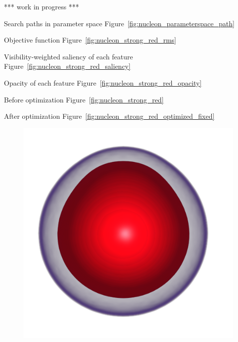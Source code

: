 *** work in progress ***

Search paths in parameter space
Figure~\ref{fig:nucleon_parameterspace_path}

Objective function
Figure~\ref{fig:nucleon_strong_red_rms}

Visibility-weighted saliency of each feature
Figure~\ref{fig:nucleon_strong_red_saliency}

Opacity of each feature
Figure~\ref{fig:nucleon_strong_red_opacity}

Before optimization
Figure~\ref{fig:nucleon_strong_red}

After optimization
Figure~\ref{fig:nucleon_strong_red_optimized_fixed}

\begin{figure}
	\centering
	\begin{minipage}{.35\textwidth}
		\includegraphics[width=1\linewidth]{images/nucleon_strong_red}
	\end{minipage}~
	\begin{minipage}{.2\textwidth}

\end{minipage}
\end{figure}
